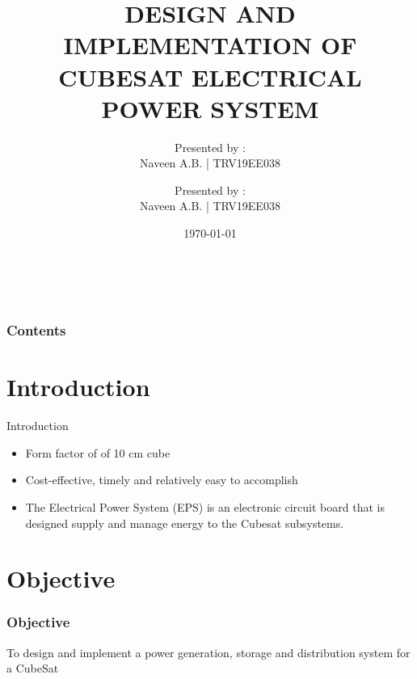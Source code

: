 \documentclass[aspectratio=169]{beamer}
\begin{document}
	\title{DESIGN AND IMPLEMENTATION OF
		CUBESAT ELECTRICAL POWER
		SYSTEM}
	
	\subtitle{}
     \author{Presented by :\\Naveen A.B. | TRV19EE038}
      \author{Presented by :\\Naveen A.B. | TRV19EE038}
	\date{\today}
	
	
{%
	\hbox{%
		\hbox{\insertslidenavigationsymbol}
		\hbox{\insertframenavigationsymbol}
		\hbox{\insertsubsectionnavigationsymbol}
		\hbox{\insertsectionnavigationsymbol}
		\hbox{\insertdocnavigationsymbol}
		\hbox{\insertbackfindforwardnavigationsymbol}}%
}
	\begin{frame}[plain]
	\maketitle
\end{frame}


\begin{frame}
\frametitle{Contents}




\tableofcontents
\end{frame}


\section{Introduction}
\begin{frame}{Introduction}
	
	\begin{itemize}
		\item Form factor of
		of 10 cm cube
		\item  Cost-effective, timely and relatively easy to accomplish
		\item  The Electrical Power System (EPS) is an electronic circuit board that is designed supply and manage energy to the Cubesat subsystems.


		
	\end{itemize} 
	
\end{frame}


\section{Objective}
\begin{frame}
	
\frametitle{Objective}
 To design and implement a power generation, storage and distribution system for a CubeSat 
 
 

\end{frame}
\end{document}
